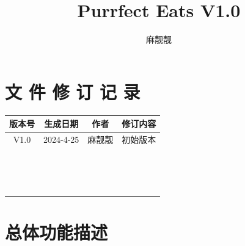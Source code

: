 \documentclass{mancls}%
\title{Purrfect Eats V1.0}
\author{麻靓靓} %
\begin{document}
\section*{文 件 修 订 记 录}


\begin{longtable}{|c|c|c|c|}
  \hline
  \textbf{版本号} & \textbf{生成日期} & \textbf{作者} & \textbf{修订内容} \\
  \hline
  V1.0         & 2024-4-25     & 麻靓靓         & 初始版本          \\
  \hline
               &               &             &               \\
  \hline
               &               &             &               \\
  \hline
               &               &             &               \\
  \hline
               &               &             &               \\
  \hline
               &               &             &               \\
  \hline
               &               &             &               \\
  \hline
               &               &             &               \\
  \hline
               &               &             &               \\
  \hline
               &               &             &               \\
  \hline
               &               &             &               \\
  \hline
               &               &             &               \\
  \hline
               &               &             &               \\
  \hline
               &               &             &               \\
  \hline
               &               &             &               \\
  \hline
               &               &             &               \\
  \hline
\end{longtable}
\pagebreak

\section{总体功能描述}
\end{document}
